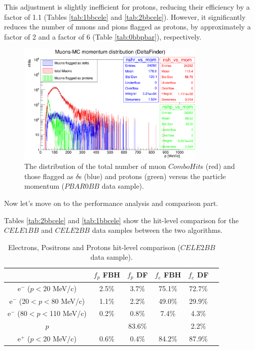 This adjustment is slightly inefficient for protons, reducing their 
efficiency by a factor of 1.1 (Tables \ref{tab:1bbcele} and \ref{tab:2bbcele}). 
However, it significantly reduces the 
number of muons and pions flagged as protons, by approximately 
a factor of 2 and a factor of 6 (Table \ref{tab:0bbpbar}), respectively.

 \begin{figure}[!h]
            \centering
            \includegraphics[width =0.8\textwidth]{figures/png/Screenshot_20240805_222923.png}
        \caption[The distribution of the total and flagged number of muon $ComboHit$s versus momentum.]{The 
        distribution of the total number of muon $ComboHit$s 
        (red) and those flagged as $\delta$s (blue) 
        and protons (green) versus the particle momentum ($PBAR0BB$ data sample). }
           \label{fig:0pbarbefore}
\end{figure}




Now let's move on to the performance analysis and comparison part.

Tables \ref{tab:2bbcele} and \ref{tab:1bbcele} show the hit-level 
comparison for the $CELE1BB$ and $CELE2BB$ data samples between the two algorithms.
\begin{center}
    \begin{table}[h!]
    \centering
    \renewcommand{\arraystretch}{1.}
    \begin{tabular}{| c | c | c | c | c | c |} 
    \hline
    &  $f_{p}$ FBH &  $f_{p}$ DF & $f_{e}$ FBH  & $f_{e}$ DF \\
    \hline
    e$^-$ ($p<$20 MeV/c)      & 2.5\% & 3.7\%   & 75.1\% & 72.7\%\\
    \hline
    e$^-$ (20$<p<$80 MeV/c)  & 1.1\% & 2.2\%   & 49.0\%& 29.9\%\\
    \hline
    e$^-$ (80$<p<$110 MeV/c)   & 0.2\% & 0.8\%  &  7.4\%& 4.3\%\\
    \hline
    $p$       &  &  83.6\%  &  & 2.2\%\\
    \hline
    e$^+$ ($p<$20 MeV/c)   & 0.6\%& 0.4\%    &   84.2\%& 87.9\%\\
    \hline
    \end{tabular}
    \caption[Electrons, 
    Positrons and Protons hit-level comparison.]{Electrons, 
    Positrons and Protons hit-level comparison ($CELE2BB$ data sample).}
    \end{table}\label{tab:2bbcele}
    \end{center}

